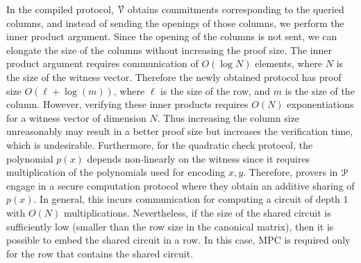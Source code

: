 In the compiled protocol, $\mathcal{V}$ obtains commitments corresponding to the queried columns, and instead of sending the openings of those columns, we perform the inner product argument. Since the opening of the columns is not sent, we can elongate the size of the columns without increasing the proof size. The inner product argument requires communication of $O(\log N)$ elements, where $N$ is the size of the witness vector. Therefore the newly obtained protocol has proof size $O(\ell + \log (m))$, where $\ell$ is the size of the row, and $m$ is the size of the column. However, verifying these inner products requires $O(N)$ exponentiations for a witness vector of dimension $N$. Thus increasing the column size unreasonably may result in a better proof size but increases the verification time, which is undesirable.
Furthermore, for the quadratic check protocol, the polynomial $p(x)$ depends non-linearly on the witness since it requires multiplication of the polynomials used for encoding $x, y$. Therefore, provers in $\mathcal{P}$ engage in a secure computation protocol where they obtain an additive sharing of $p(x)$. In general, this incurs communication for computing a circuit of depth $1$ with $O(N)$ multiplications. Nevertheless, if the size of the shared circuit is sufficiently low (smaller than the row size in the canonical matrix), then it is possible to embed the shared circuit in a row. In this case, MPC is required only for the row that contains the shared circuit.

